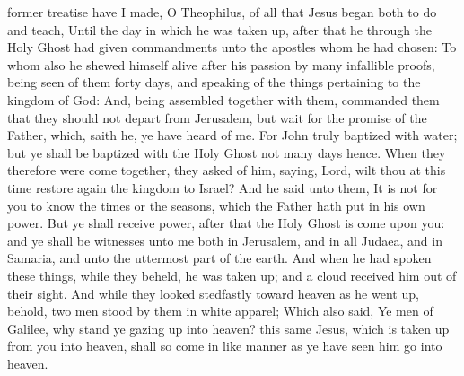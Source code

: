  former treatise have I made, O Theophilus, of all that Jesus began both to do and teach, Until the day in which he was taken up, after that he through the Holy Ghost had given commandments unto the apostles whom he had chosen: To whom also he shewed himself alive after his passion by many infallible proofs, being seen of them forty days, and speaking of the things pertaining to the kingdom of God: And, being assembled together with them, commanded them that they should not depart from Jerusalem, but wait for the promise of the Father, which, saith he, ye have heard of me. For John truly baptized with water; but ye shall be baptized with the Holy Ghost not many days hence. When they therefore were come together, they asked of him, saying, Lord, wilt thou at this time restore again the kingdom to Israel? And he said unto them, It is not for you to know the times or the seasons, which the Father hath put in his own power. But ye shall receive power, after that the Holy Ghost is come upon you: and ye shall be witnesses unto me both in Jerusalem, and in all Judaea, and in Samaria, and unto the uttermost part of the earth. And when he had spoken these things, while they beheld, he was taken up; and a cloud received him out of their sight. And while they looked stedfastly toward heaven as he went up, behold, two men stood by them in white apparel; Which also said, Ye men of Galilee, why stand ye gazing up into heaven? this same Jesus, which is taken up from you into heaven, shall so come in like manner as ye have seen him go into heaven.


